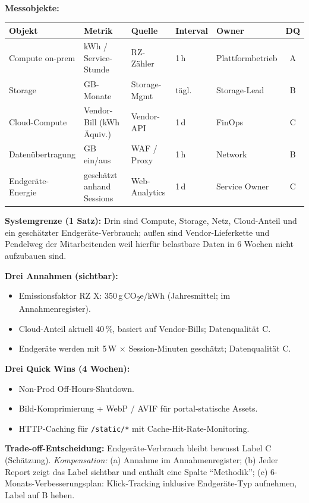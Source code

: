 \documentclass[11pt,a4paper,oneside]{article}
\begin{document}
\begin{loesungbox}
\textbf{Messobjekte:}

\smallskip
\begin{tabularx}{\linewidth}{@{}p{2.6cm}p{2.6cm}p{2.0cm}p{1.4cm}p{2.0cm}c@{}}
\toprule
\textbf{Objekt} & \textbf{Metrik} & \textbf{Quelle} & \textbf{Interval} & \textbf{Owner} & \textbf{DQ} \\
\midrule
Compute on-prem & kWh / Service-Stunde & RZ-Z\"ahler  & 1\,h  & Plattformbetrieb & A \\
Storage         & GB-Monate            & Storage-Mgmt & t\"agl. & Storage-Lead    & B \\
Cloud-Compute   & Vendor-Bill (kWh \"Aquiv.) & Vendor-API & 1\,d & FinOps          & C \\
Daten\"ubertragung & GB ein/aus       & WAF / Proxy  & 1\,h  & Network         & B \\
Endger\"ate-Energie & gesch\"atzt anhand Sessions & Web-Analytics & 1\,d & Service Owner & C \\
\bottomrule
\end{tabularx}

\smallskip
\textbf{Systemgrenze (1 Satz):} Drin sind Compute, Storage, Netz, Cloud-Anteil und ein gesch\"atzter Endger\"ate-Verbrauch; au{\ss}en sind Vendor-Lieferkette und Pendelweg der Mitarbeitenden \textendash{} weil hierf\"ur belastbare Daten in 6 Wochen nicht aufzubauen sind.

\smallskip
\textbf{Drei Annahmen (sichtbar):}
\begin{itemize}
  \item Emissionsfaktor RZ X: 350\,g\,CO\textsubscript{2}e/kWh (Jahresmittel; im Annahmenregister).
  \item Cloud-Anteil aktuell 40\,\%, basiert auf Vendor-Bills; Datenqualit\"at C.
  \item Endger\"ate werden mit 5\,W $\times$ Session-Minuten gesch\"atzt; Datenqualit\"at C.
\end{itemize}

\smallskip
\textbf{Drei Quick Wins (4 Wochen):}
\begin{itemize}
  \item Non-Prod Off-Hours-Shutdown.
  \item Bild-Komprimierung + WebP / AVIF f\"ur portal-statische Assets.
  \item HTTP-Caching f\"ur \texttt{/static/*} mit Cache-Hit-Rate-Monitoring.
\end{itemize}

\smallskip
\textbf{Trade-off-Entscheidung:} Endger\"ate-Verbrauch bleibt bewusst Label C (Sch\"atzung). \emph{Kompensation:} (a) Annahme im Annahmenregister; (b) Jeder Report zeigt das Label sichtbar und enth\"alt eine Spalte ``Methodik''; (c) 6-Monats-Verbesserungsplan: Klick-Tracking inklusive Endger\"ate-Typ aufnehmen, Label auf B heben.
\end{loesungbox}
\end{document}
